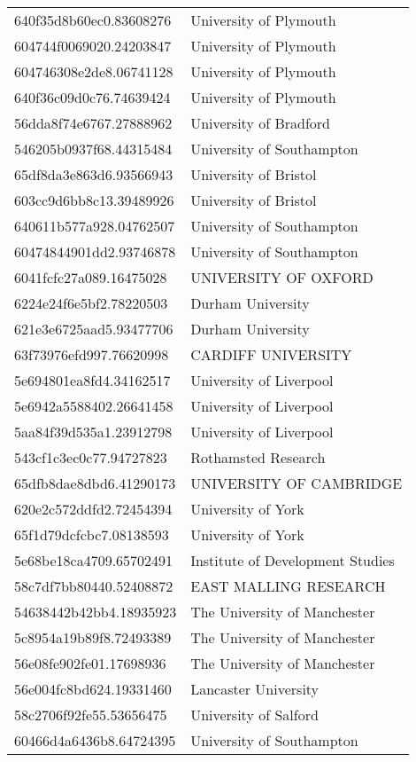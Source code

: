 \begin{tabular}{ll}
640f35d8b60ec0.83608276 & University of Plymouth \\
604744f0069020.24203847 & University of Plymouth \\
604746308e2de8.06741128 & University of Plymouth \\
640f36c09d0c76.74639424 & University of Plymouth \\
56dda8f74e6767.27888962 & University of Bradford \\
546205b0937f68.44315484 & University of Southampton \\
65df8da3e863d6.93566943 & University of Bristol \\
603cc9d6bb8c13.39489926 & University of Bristol \\
640611b577a928.04762507 & University of Southampton \\
60474844901dd2.93746878 & University of Southampton \\
6041fcfc27a089.16475028 & UNIVERSITY OF OXFORD \\
6224e24f6e5bf2.78220503 & Durham University \\
621e3e6725aad5.93477706 & Durham University \\
63f73976efd997.76620998 & CARDIFF UNIVERSITY \\
5e694801ea8fd4.34162517 & University of Liverpool \\
5e6942a5588402.26641458 & University of Liverpool \\
5aa84f39d535a1.23912798 & University of Liverpool \\
543cf1c3ec0c77.94727823 & Rothamsted Research \\
65dfb8dae8dbd6.41290173 & UNIVERSITY OF CAMBRIDGE \\
620e2c572ddfd2.72454394 & University of York \\
65f1d79dcfcbc7.08138593 & University of York \\
5e68be18ca4709.65702491 & Institute of Development Studies \\
58c7df7bb80440.52408872 & EAST MALLING RESEARCH \\
54638442b42bb4.18935923 & The University of Manchester \\
5c8954a19b89f8.72493389 & The University of Manchester \\
56e08fe902fe01.17698936 & The University of Manchester \\
56e004fc8bd624.19331460 & Lancaster University \\
58c2706f92fe55.53656475 & University of Salford \\
60466d4a6436b8.64724395 & University of Southampton \\

\end{tabular}
